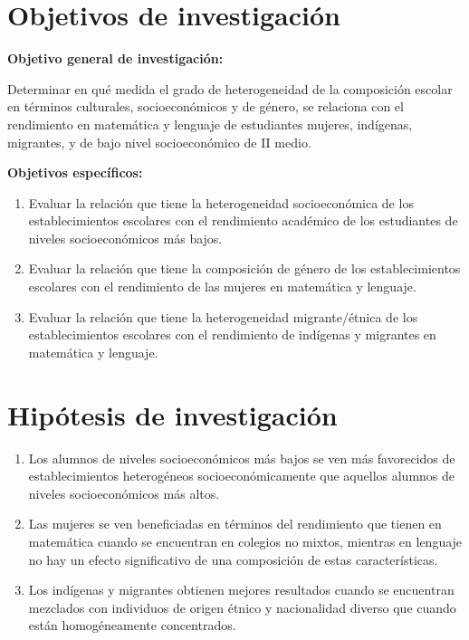 \documentclass[
]{article}
\providecommand{\tightlist}{%
  \setlength{\itemsep}{0pt}\setlength{\parskip}{0pt}}
\begin{document}
\hypertarget{objetivos-de-investigaciuxf3n}{%
\section{Objetivos de
investigación}\label{objetivos-de-investigaciuxf3n}}

\textbf{Objetivo general de investigación:}

Determinar en qué medida el grado de heterogeneidad de la composición
escolar en términos culturales, socioeconómicos y de género, se
relaciona con el rendimiento en matemática y lenguaje de estudiantes
mujeres, indígenas, migrantes, y de bajo nivel socioeconómico de II
medio.

\textbf{Objetivos específicos:}

\begin{enumerate}
\def\labelenumi{(\arabic{enumi})}
\tightlist
\item
  Evaluar la relación que tiene la heterogeneidad socioeconómica de los
  establecimientos escolares con el rendimiento académico de los
  estudiantes de niveles socioeconómicos más bajos.
\item
  Evaluar la relación que tiene la composición de género de los
  establecimientos escolares con el rendimiento de las mujeres en
  matemática y lenguaje.
\item
  Evaluar la relación que tiene la heterogeneidad migrante/étnica de los
  establecimientos escolares con el rendimiento de indígenas y migrantes
  en matemática y lenguaje.
\end{enumerate}

\hypertarget{hipuxf3tesis-de-investigaciuxf3n}{%
\section{Hipótesis de
investigación}\label{hipuxf3tesis-de-investigaciuxf3n}}

\begin{enumerate}
\def\labelenumi{(\arabic{enumi})}
\tightlist
\item
  Los alumnos de niveles socioeconómicos más bajos se ven más
  favorecidos de establecimientos heterogéneos socioeconómicamente que
  aquellos alumnos de niveles socioeconómicos más altos.
\item
  Las mujeres se ven beneficiadas en términos del rendimiento que tienen
  en matemática cuando se encuentran en colegios no mixtos, mientras en
  lenguaje no hay un efecto significativo de una composición de estas
  características.
\item
  Los indígenas y migrantes obtienen mejores resultados cuando se
  encuentran mezclados con individuos de origen étnico y nacionalidad
  diverso que cuando están homogéneamente concentrados.
\end{enumerate}
\end{document}
